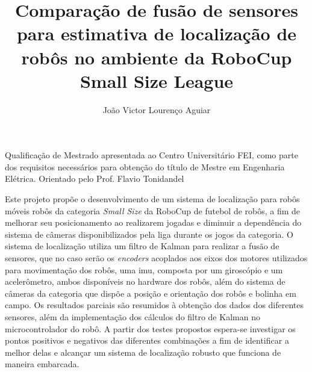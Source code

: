 \documentclass[acronym, symbols, table]{fei}
\title{Comparação de fusão de sensores para estimativa de localização de robôs no ambiente da RoboCup Small Size League}
\author{João Victor Lourenço Aguiar}
\begin{document}
	
\maketitle

\begin{folhaderosto}
	Qualificação de Mestrado apresentada ao Centro Universitário FEI, como parte dos requisitos necessários para obtenção do título de Mestre em Engenharia Elétrica. Orientado pelo Prof. Flavio Tonidandel
\end{folhaderosto}
	
\begin{resumo}
	

	Este projeto propõe o desenvolvimento de um sistema de localização para robôs móveis robôs da categoria \textit{Small Size} da RoboCup de futebol de robôs, a fim de melhorar seu posicionamento ao realizarem jogadas e diminuir a dependência do sistema de câmeras disponibilizados pela liga durante os jogos da categoria. O sistema de localização utiliza um filtro de Kalman para realizar a fusão de sensores, que no caso serão os \textit{encoders} acoplados aos eixos dos motores utilizados para movimentação dos robôs, uma \acrshort{imu}, composta por um giroscópio e um acelerômetro, ambos disponíveis no hardware dos robôs, além do sistema de câmeras da categoria que dispõe a posição e orientação dos robôs e bolinha em campo. Os resultados parciais são resumidos à obtenção dos dados dos diferentes sensores, além da implementação dos cálculos do filtro de Kalman no microcontrolador do robô. A partir dos testes propostos espera-se investigar os pontos positivos e negativos das diferentes combinações a fim de identificar a melhor delas e alcançar um sistema de localização robusto que funciona de maneira embarcada.
	

\end{resumo}
\end{document}
